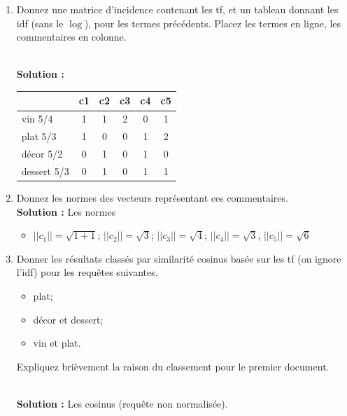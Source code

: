 \documentclass[11pt,a4paper]{article}
\newenvironment{solution}[0]{
~\\ \color{red} \textbf{Solution : }\color{black}}{%
}
\begin{document}
\begin{enumerate}
   \item Donnez une matrice d'incidence contenant les tf, 
      et un tableau donnant les idf (sans le $\log$), pour les  termes précédents. Placez
      les termes en ligne, les commentaires en colonne.

\begin{solution}
\begin{center}
\begin{tabular}{l|c|c|c|c|c}
            & \textbf{c1} & \textbf{c2} & \textbf{c3} &\textbf{c4}&\textbf{c5} \\ \hline  
   vin  5/4   & 1           & 1           & 2           & 0         & 1\\
   plat 5/3  & 1           & 0           & 0           & 1         & 2\\
   décor 5/2  & 0           & 1           & 0           & 1         & 0\\
   dessert 5/3  & 0           & 1           & 0           & 1         & 1\\\hline
   \end{tabular}
\end{center}
\end{solution}

  \item Donnez les normes des vecteurs représentant ces commentaires.
\begin{solution}
Les normes
\begin{itemize}
  \item $||c_1|| = \sqrt{1+ 1}$; $||c_2|| = \sqrt{3}$; $||c_3|| = \sqrt{4}$; 
    $||c_4|| = \sqrt{3}$, $||c_5|| = \sqrt{6}$  
\end{itemize}
\end{solution}
  
  \item Donner les résultats classés par similarité cosinus basée sur les tf 
  (on ignore l'idf) pour les requêtes suivantes. 
  
  \begin{itemize}
    \item plat;
    \item décor et dessert;
    \item vin et plat.
  \end{itemize}

Expliquez brièvement la raison  du classement pour le premier document.

\begin{solution}
Les cosinus (requête non normalisée).


\end{solution}
\end{enumerate}
\end{document}
